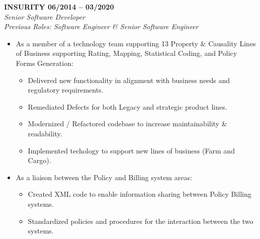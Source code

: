 


\begin{cvparagraph}

{\normalsize \textbf{ INSURITY \hfill 06/2014 -- 03/2020}} \\
{\sl Senior Software Developer} \\
{\sl Previous Roles: Software Engineer \& Senior Software Engineer} \\

\begin{itemize}
   \item As a member of a technology team supporting 13 Property \& Causality
      Lines of Business supporting Rating, Mapping, Statistical Coding, and Policy 
      Forms Generation:
   \begin{itemize}
      \item Delivered new functionality in alignment with business needs and 
         regulatory requirements.
      \item Remediated Defects for both Legacy and strategic product lines. 
      \item Modernized / Refactored codebase to increase maintainability \& 
         readability.
      \item Implemented techology to support new lines of business (Farm and Cargo).
   \end{itemize}

   \item As a liaison between the Policy and Billing system areas:
   \begin{itemize}
      \item Created XML code to enable information sharing between Policy Billing 
         systems.
      \item Standardized policies and procedures for the interaction between the 
         two systems.
   \end{itemize}


\end{itemize}
\end{cvparagraph}
